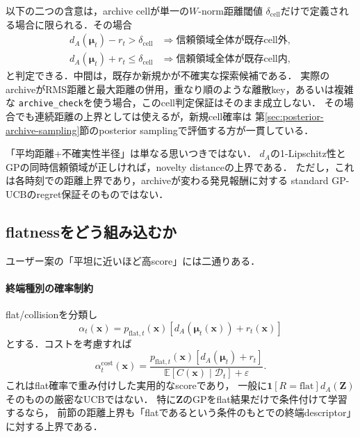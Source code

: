 \documentclass[a4paper,11pt]{ltjsarticle}
\newcommand{\E}{\mathbb E}
\newcommand{\D}{\mathcal D}
\newcommand{\code}[1]{\nolinkurl{#1}}
\begin{document}
以下の二つの含意は，archive cellが単一の\(W\)-norm距離閾値
\(\delta_{\mathrm{cell}}\)だけで定義される場合に限られる．その場合
\begin{align}
  d_A(\bm\mu_t)-r_t>\delta_{\mathrm{cell}}
  &\Rightarrow\text{信頼領域全体が既存cell外},\\
  d_A(\bm\mu_t)+r_t\leq\delta_{\mathrm{cell}}
  &\Rightarrow\text{信頼領域全体が既存cell内},
\end{align}
と判定できる．中間は，既存か新規かが不確実な探索候補である．
実際のarchiveがRMS距離と最大距離の併用，重なり順のような離散key，あるいは複雑な
\code{archive\_check}を使う場合，このcell判定保証はそのまま成立しない．
その場合でも連続距離の上界としては使えるが，新規cell確率は
第\ref{sec:posterior-archive-sampling}節のposterior samplingで評価する方が一貫している．

\begin{intuitionbox}[提案式の数学的に強い部分]
「平均距離+不確実性半径」は単なる思いつきではない．
\(d_A\)の1-Lipschitz性とGPの同時信頼領域が正しければ，novelty distanceの上界である．
ただし，これは各時刻での距離上界であり，archiveが変わる発見報酬に対する
standard GP-UCBのregret保証そのものではない．
\end{intuitionbox}

\subsection{flatnessをどう組み込むか}

ユーザー案の「平坦に近いほど高score」には二通りある．

\paragraph{終端種別の確率制約}
flat/collisionを分類し
\begin{equation}
  \alpha_t(\bm x)
  =p_{\mathrm{flat},t}(\bm x)
  \left[d_A(\bm\mu_t(\bm x))+r_t(\bm x)\right]
  \label{eq:flat-weighted-novelty-ucb}
\end{equation}
とする．コストを考慮すれば
\begin{equation}
  \alpha_t^{\mathrm{cost}}(\bm x)
  =\frac{p_{\mathrm{flat},t}(\bm x)
  [d_A(\bm\mu_t)+r_t]}
  {\E[C(\bm x)\mid\D_t]+\varepsilon}.
  \label{eq:cost-flat-novelty-ucb}
\end{equation}
これはflat確率で重み付けした実用的なscoreであり，
一般に\(\mathbf 1[R=\mathrm{flat}]d_A(\bm Z)\)そのものの厳密なUCBではない．
特に\(\bm Z\)のGPをflat結果だけで条件付けて学習するなら，
前節の距離上界も「flatであるという条件のもとでの終端descriptor」に対する上界である．
\end{document}
